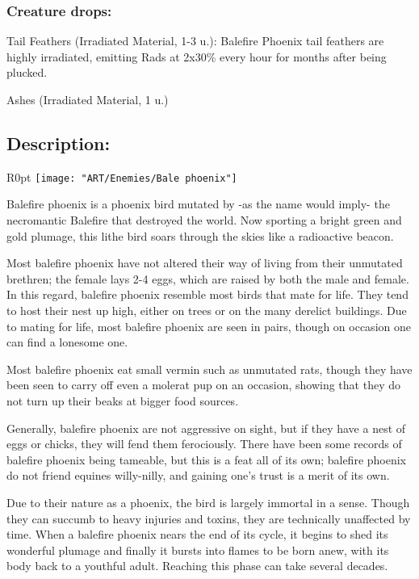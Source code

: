 \documentclass[11pt,a4paper,twocolumn]{book}
\begin{document}
	\subsubsection*{Creature drops:}
	\begin{compactitem}
		\item Tail Feathers (Irradiated Material, 1-3 u.): Balefire Phoenix tail feathers are highly irradiated, emitting Rads at 2x30\% every hour for months after being plucked.
		\item Ashes (Irradiated Material, 1 u.) 
	\end{compactitem}
	
	\subsection*{Description:}
	\begin{wrapfigure}{R}{0pt}
		\texttt{[image: "ART/Enemies/Bale phoenix"]}
	\end{wrapfigure}
	Balefire phoenix is a phoenix bird mutated by -as the name would imply- the necromantic Balefire that destroyed the world. Now sporting a bright green and gold plumage, this lithe bird soars through the skies like a radioactive beacon.
	
	Most balefire phoenix have not altered their way of living from their unmutated brethren; the female lays 2-4 eggs, which are raised by both the male and female. In this regard, balefire phoenix resemble most birds that mate for life. They tend to host their nest up high, either on trees or on the many derelict buildings. Due to mating for life, most balefire phoenix are seen in pairs, though on occasion one can find a lonesome one.
	
	Most balefire phoenix eat small vermin such as unmutated rats, though they have been seen to carry off even a molerat pup on an occasion, showing that they do not turn up their beaks at bigger food sources.
	
	Generally, balefire phoenix are not aggressive on sight, but if they have a nest of eggs or chicks, they will fend them ferociously. There have been some records of balefire phoenix being tameable, but this is a feat all of its own; balefire phoenix do not friend equines willy-nilly, and gaining one's trust is a merit of its own.
	
	Due to their nature as a phoenix, the bird is largely immortal in a sense. Though they can succumb to heavy injuries and toxins, they are technically unaffected by time. When a balefire phoenix nears the end of its cycle, it begins to shed its wonderful plumage and finally it bursts into flames to be born anew, with its body back to a youthful adult. Reaching this phase can take several decades.
	
\end{document}
